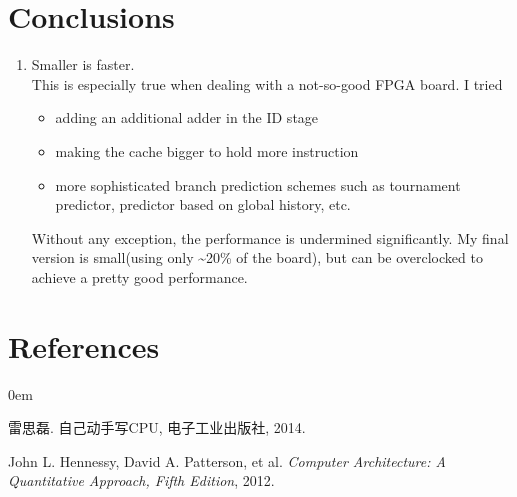 \documentclass[UTF8, 12pt]{ctexart}
\begin{document}
    \section{Conclusions}
        \begin{enumerate}[label=(\arabic*)]
            \item Smaller is faster. \\
                This is especially true when dealing with a not-so-good FPGA board. I tried
                \begin{itemize}\itemsep0em
                    \item adding an additional adder in the ID stage
                    \item making the cache bigger to hold more instruction
                    \item more sophisticated branch prediction schemes such as tournament predictor, predictor based on global history, etc.
                \end{itemize}
                Without any exception, the performance is undermined significantly.
                My final version is small(using only \~{}20\% of the board), but can be overclocked to achieve a pretty good performance.
            
        \end{enumerate}
    \section{References}
        \begin{enumerate}[label={[\arabic*]}]\itemsep0em
            \item 雷思磊. 自己动手写CPU, 电子工业出版社, 2014.
            \item John L. Hennessy, David A. Patterson, et al. \textit{Computer Architecture: A Quantitative Approach, Fifth Edition}, 2012.
        \end{enumerate}
\end{document}
